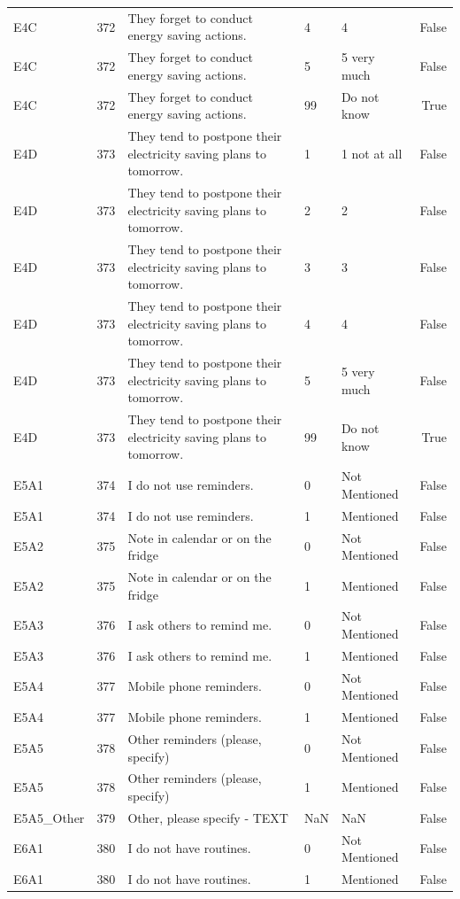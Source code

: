 \begin{tabular}{lrlllr}
E4C & 372 & They forget to conduct energy saving actions. & 4 & 4 & False \\
E4C & 372 & They forget to conduct energy saving actions. & 5 & 5 very much & False \\
E4C & 372 & They forget to conduct energy saving actions. & 99 & Do not know & True \\
E4D & 373 & They tend to postpone their electricity saving plans to tomorrow. & 1 & 1 not at all & False \\
E4D & 373 & They tend to postpone their electricity saving plans to tomorrow. & 2 & 2 & False \\
E4D & 373 & They tend to postpone their electricity saving plans to tomorrow. & 3 & 3 & False \\
E4D & 373 & They tend to postpone their electricity saving plans to tomorrow. & 4 & 4 & False \\
E4D & 373 & They tend to postpone their electricity saving plans to tomorrow. & 5 & 5 very much & False \\
E4D & 373 & They tend to postpone their electricity saving plans to tomorrow. & 99 & Do not know & True \\
E5A1 & 374 & I do not use reminders. & 0 & Not Mentioned & False \\
E5A1 & 374 & I do not use reminders. & 1 & Mentioned & False \\
E5A2 & 375 & Note in calendar or on the fridge & 0 & Not Mentioned & False \\
E5A2 & 375 & Note in calendar or on the fridge & 1 & Mentioned & False \\
E5A3 & 376 & I ask others to remind me. & 0 & Not Mentioned & False \\
E5A3 & 376 & I ask others to remind me. & 1 & Mentioned & False \\
E5A4 & 377 & Mobile phone reminders. & 0 & Not Mentioned & False \\
E5A4 & 377 & Mobile phone reminders. & 1 & Mentioned & False \\
E5A5 & 378 & Other reminders (please, specify) & 0 & Not Mentioned & False \\
E5A5 & 378 & Other reminders (please, specify) & 1 & Mentioned & False \\
E5A5_Other & 379 & Other, please specify - TEXT & NaN & NaN & False \\
E6A1 & 380 & I do not have routines. & 0 & Not Mentioned & False \\
E6A1 & 380 & I do not have routines. & 1 & Mentioned & False \\

\end{tabular}

